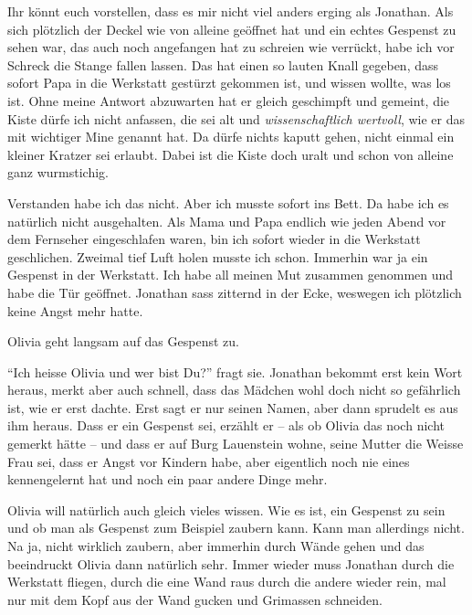 \begin{mdframed}[style=mystyle]
  Ihr könnt euch vorstellen, dass es mir nicht viel anders erging als Jonathan. Als sich plötzlich der Deckel wie von alleine geöffnet hat und ein echtes Gespenst zu sehen war, das auch noch angefangen hat zu schreien wie verrückt, habe ich vor Schreck die Stange fallen lassen. Das hat einen so lauten Knall gegeben, dass sofort Papa in die Werkstatt gestürzt gekommen ist, und wissen wollte, was los ist. Ohne meine Antwort abzuwarten hat er gleich geschimpft und gemeint, die Kiste dürfe ich nicht anfassen, die sei alt und \emph{wissenschaftlich wertvoll}, wie er das mit wichtiger Mine genannt hat. Da dürfe nichts kaputt gehen, nicht einmal ein kleiner Kratzer sei erlaubt. Dabei ist die Kiste doch uralt und schon von alleine ganz wurmstichig. 
  
Verstanden habe ich das nicht. Aber ich musste sofort ins Bett. Da habe ich es natürlich nicht ausgehalten. Als Mama und Papa endlich wie jeden Abend vor dem Fernseher eingeschlafen waren, bin ich sofort wieder in die Werkstatt geschlichen. Zweimal tief Luft holen musste ich schon. Immerhin war ja ein Gespenst in der Werkstatt. Ich habe all meinen Mut zusammen genommen und habe die Tür geöffnet. Jonathan sass zitternd in der Ecke, weswegen ich plötzlich keine Angst mehr hatte. 
\end{mdframed}

Olivia geht langsam auf das Gespenst zu. 

\enquote{Ich heisse Olivia und wer bist Du?} fragt sie. Jonathan bekommt erst kein Wort heraus, merkt aber auch schnell, dass das Mädchen wohl doch nicht so gefährlich ist, wie er erst dachte. Erst sagt er nur seinen Namen, aber dann sprudelt es aus ihm heraus. Dass er ein Gespenst sei, erzählt er -- als ob Olivia das noch nicht gemerkt hätte -- und dass er auf Burg Lauenstein wohne, seine Mutter die Weisse Frau sei, dass er Angst vor Kindern habe, aber eigentlich noch nie eines kennengelernt hat und noch ein paar andere Dinge mehr. 

Olivia will natürlich auch gleich vieles wissen. Wie es ist, ein Gespenst zu sein und ob man als Gespenst zum Beispiel zaubern kann. Kann man allerdings nicht. Na ja, nicht wirklich zaubern, aber immerhin durch Wände gehen und das beeindruckt Olivia dann natürlich sehr. Immer wieder muss Jonathan durch die Werkstatt fliegen, durch die eine Wand raus durch die andere wieder rein, mal nur mit dem Kopf aus der Wand gucken und Grimassen schneiden. 

